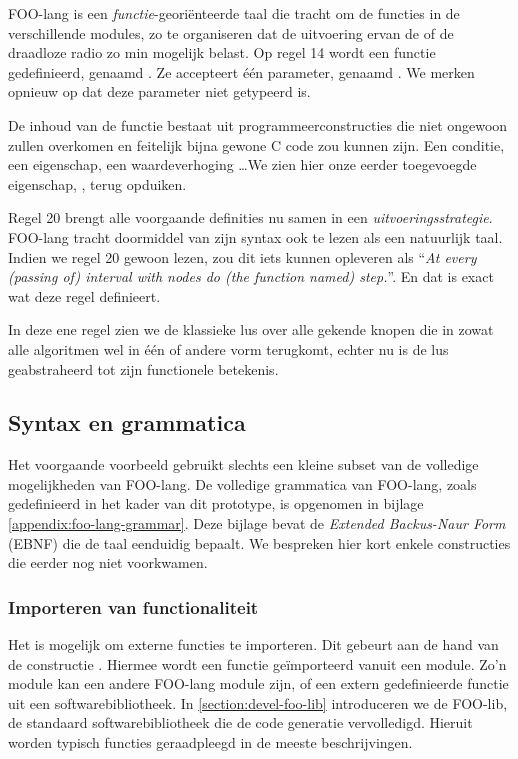 FOO-lang is een \emph{functie}-geori\"enteerde taal die tracht om de functies
in de verschillende modules, zo te organiseren dat de uitvoering ervan de \mcu
of de draadloze radio zo min mogelijk belast. Op regel 14 wordt een functie
gedefinieerd, genaamd . Ze accepteert \'e\'en parameter, genaamd
. We merken opnieuw op dat deze parameter niet getypeerd is.

De inhoud van de functie bestaat uit programmeerconstructies die niet ongewoon
zullen overkomen en feitelijk bijna gewone C code zou kunnen zijn. Een
conditie, een eigenschap, een waardeverhoging \dots We zien hier onze eerder
toegevoegde eigenschap, , terug opduiken.

Regel 20 brengt alle voorgaande definities nu samen in een
\emph{uitvoeringsstrategie}. FOO-lang tracht doormiddel van zijn syntax ook te
lezen als een natuurlijk taal. Indien we regel 20 gewoon lezen, zou dit iets
kunnen opleveren als ``\emph{At every (passing of) interval with nodes do (the
function named) step.}''. En dat is exact wat deze regel definieert.

In deze ene regel zien we de klassieke lus over alle gekende knopen die in
zowat alle algoritmen wel in \'e\'en of andere vorm terugkomt, echter nu is de
lus geabstraheerd tot zijn functionele betekenis.

\subsection{Syntax en grammatica}
\label{subsection:devel-foo-lang-grammar}

Het voorgaande voorbeeld gebruikt slechts een kleine subset van de volledige
mogelijkheden van FOO-lang. De volledige grammatica van FOO-lang, zoals
gedefinieerd in het kader van dit prototype, is opgenomen in bijlage
\ref{appendix:foo-lang-grammar}. Deze bijlage bevat de \emph{Extended
Backus-Naur Form} (EBNF) die de taal eenduidig bepaalt. We bespreken hier kort
enkele constructies die eerder nog niet voorkwamen.

\subsubsection{Importeren van functionaliteit}

Het is mogelijk om externe functies te importeren. Dit gebeurt aan de hand van
de constructie . Hiermee wordt een functie
ge\"importeerd vanuit een module. Zo'n module kan een andere FOO-lang module
zijn, of een extern gedefinieerde functie uit een softwarebibliotheek. In
\ref{section:devel-foo-lib} introduceren we de FOO-lib, de standaard
softwarebibliotheek die de code generatie vervolledigd. Hieruit worden typisch
functies geraadpleegd in de meeste beschrijvingen.

